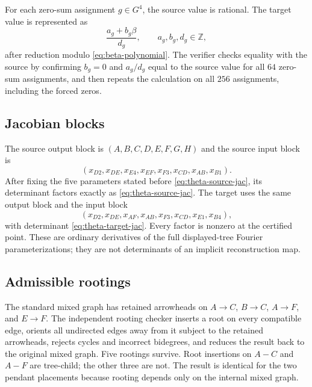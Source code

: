 For each zero-sum assignment $g\in G^4$, the source value is rational.  The target value is represented as
\[
\frac{a_g+b_g\beta}{d_g},
\qquad a_g,b_g,d_g\in\mathbb Z,
\]
after reduction modulo \eqref{eq:beta-polynomial}.  The verifier checks equality with the source by confirming $b_g=0$ and $a_g/d_g$ equal to the source value for all $64$ zero-sum assignments, and then repeats the calculation on all $256$ assignments, including the forced zeros.

\subsection{Jacobian blocks}

The source output block is $(A,B,C,D,E,F,G,H)$ and the source input block is
\[
(x_{D2},x_{DE},x_{E4},x_{EF},x_{F3},x_{CD},x_{AB},x_{B1}).
\]
After fixing the five parameters stated before \eqref{eq:theta-source-jac}, its determinant factors exactly as \eqref{eq:theta-source-jac}.  The target uses the same output block and the input block
\[
(x_{D2},x_{DE},x_{AF},x_{AB},x_{F3},x_{CD},x_{E1},x_{B4}),
\]
with determinant \eqref{eq:theta-target-jac}.  Every factor is nonzero at the certified point.  These are ordinary derivatives of the full displayed-tree Fourier parameterizations; they are not determinants of an implicit reconstruction map.

\subsection{Admissible rootings}

The standard mixed graph has retained arrowheads on $A\to C$, $B\to C$, $A\to F$, and $E\to F$.  The independent rooting checker inserts a root on every compatible edge, orients all undirected edges away from it subject to the retained arrowheads, rejects cycles and incorrect bidegrees, and reduces the result back to the original mixed graph.  Five rootings survive.  Root insertions on $A-C$ and $A-F$ are tree-child; the other three are not.  The result is identical for the two pendant placements because rooting depends only on the internal mixed graph.
